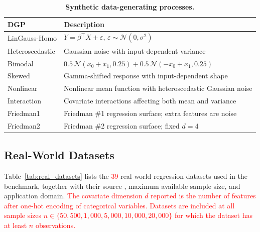 \documentclass{article}
\begin{document}
\begin{table}[t]
\centering
\caption{\textbf{Synthetic data-generating processes.}}
\label{tab:synthetic_dgps}
\small
\begin{tabular}{lp{9cm}}
\toprule
\textbf{DGP} & \textbf{Description} \\
\midrule
LinGauss-Homo    & $Y=\beta^\top X+\varepsilon$, $\varepsilon\sim\mathcal N(0,\sigma^2)$ \\
Heteroscedastic  & Gaussian noise with input-dependent variance \\
Bimodal          & $0.5\,\mathcal N(x_0+x_1,0.25)+0.5\,\mathcal N(-x_0+x_1,0.25)$ \\
Skewed           & Gamma-shifted response with input-dependent shape \\
Nonlinear        & Nonlinear mean function with heteroscedastic Gaussian noise \\
Interaction      & Covariate interactions affecting both mean and variance \\
Friedman1        & Friedman \#1 regression surface; extra features are noise \\
Friedman2        & Friedman \#2 regression surface; fixed $d=4$ \\
\bottomrule
\end{tabular}
\end{table}

\subsection{Real-World Datasets}
\label{app:real_datasets}

Table~\ref{tab:real_datasets} lists the \textcolor{red}{39} real-world regression datasets used
in the benchmark, together with their source \citep{vanschoren2013openml,sdss_dr18}, maximum available sample size,
and application domain. \textcolor{red}{The covariate dimension $d$ reported is the number of features after one-hot encoding of categorical variables. Datasets are included at all sample sizes $n \in \{50, 500, 1{,}000, 5{,}000, 10{,}000, 20{,}000\}$ for which the dataset has at least $n$ observations.}
\end{document}
